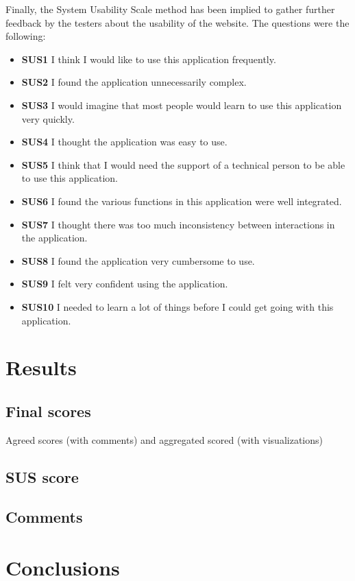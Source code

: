 Finally, the System Usability Scale method has been implied to gather further feedback by the testers about the usability of the website. The questions were the following:
\begin{itemize}
	\item \textbf{SUS1} I think I would like to use this application frequently.
	\item \textbf{SUS2} I found the application unnecessarily complex.
	\item \textbf{SUS3} I would imagine that most people would learn to use this application very quickly.
	\item \textbf{SUS4} I thought the application was easy to use.
	\item \textbf{SUS5} I think that I would need the support of a technical person to be able to use this application.
	\item \textbf{SUS6} I found the various functions in this application were well integrated.
	\item \textbf{SUS7} I thought there was too much inconsistency between interactions in the application.
	\item \textbf{SUS8} I found the application very cumbersome to use.
	\item \textbf{SUS9} I felt very confident using the application.
	\item \textbf{SUS10} I needed to learn a lot of things before I could get going with this application.
\end{itemize}

\section{Results}
\subsection{Final scores}
Agreed scores (with comments) and aggregated scored (with visualizations)

\subsection{SUS score}

\subsection{Comments}

\section{Conclusions}
